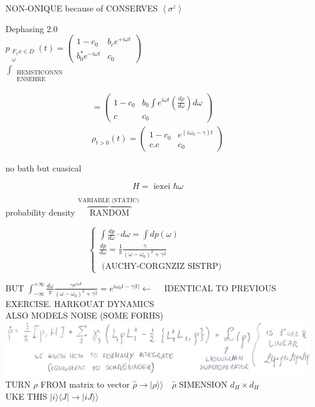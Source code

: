 \documentclass[10pt]{article}
\begin{document}
NON-ONIQUE because of CONSERVES $\left\langle\sigma^{z}\right\rangle$

Dephasing 2.0\\
$p_{\substack{F_{1} x \in D \\ \omega}}(t)=\left(\begin{array}{cc}1-c_{0} & b_{c} e^{+i \omega t} \\ b_{0}^{*} e^{-i \omega t} & c_{0}\end{array}\right)$\\
$\int_{\substack{\text { HEMSTICONNN } \\ \text { ENSEHRE }}}$

$$
\begin{array}{r}
=\left(\begin{array}{cc}
1-c_{0} & b_{0} \int e^{i \omega t}\left(\frac{d \rho}{d \omega}\right) d \omega \\
c & c_{0}
\end{array}\right) \\
\rho_{t>0}(t)=\left(\begin{array}{cc}
1-c_{0} & e^{\left(i \omega_{0}-\gamma\right) t} \\
c . c & c_{0}
\end{array}\right)
\end{array}
$$

no bath but cuasical

$$
H=\text { iexei } \hbar \omega
$$

probability density $\overbrace{\text { RANDOM }}^{\text {VARIABLE (STATIC) }}$

$$
\left\{\begin{array}{l}
\int \frac{d p}{d \omega} \cdot d \omega=\int d p(\omega) \\
\frac{d p}{d \omega}=\frac{1}{\pi} \frac{\gamma}{\left(\omega-\omega_{0}\right)^{2}+\gamma^{2}} \\
\text { (AUCHY-CORGNZIZ SISTRP) }
\end{array}\right.
$$

BUT $\int_{-\infty}^{+\infty} \frac{d \omega}{\pi} \frac{\gamma e^{i \omega t}}{\left(\omega-\omega_{0}\right)^{2}+\gamma^{2}}=e^{i \omega_{0} t-\gamma|t|} \leftarrow \quad$ IDENTICAL TO PREVIOUS\\
EXERCISE. HARKOUAT DYNAMICS\\
ALSO MODELS NOISE (SOME FORHS)\\
\includegraphics[max width=\textwidth, center]{2025_10_16_1bd50d0393172dac5e59g-11}\\
TURN $\rho$ FROM matrix to vector $\hat{\rho} \rightarrow|\rho\rangle\rangle \quad \hat{\rho}$ SIMENSION $d_{H} \times d_{H}$\\
UKE THIS $|i\rangle\langle J| \rightarrow|i J\rangle\rangle$
\end{document}

